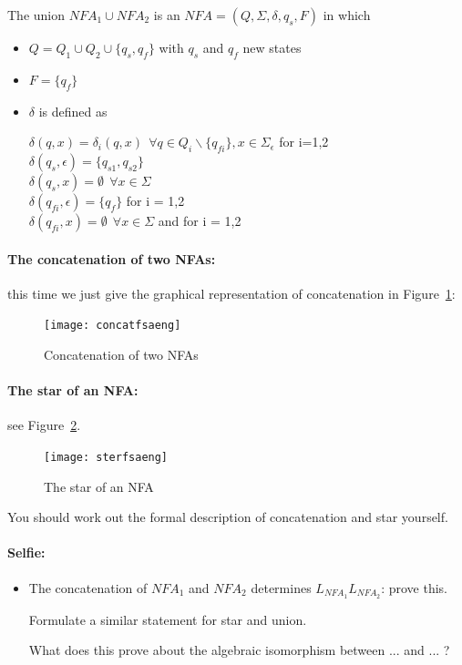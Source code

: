 The union $NFA_1 \cup NFA_2$ is an $NFA = (Q,\Sigma,\delta,q_s,F)$
in which
\begin{itemize}
\item $Q = Q_1 \cup Q_2 \cup \{q_s,q_f\}$ with $q_s$ and $q_f$ new states
\item $F = \{q_f\}$
\item $\delta$ is defined as

 $\delta(q,x) = \delta_i(q,x)~~\forall q \in Q_i \backslash \{q_{fi}\}, x \in \Sigma_\epsilon$ for i=1,2 \\
 $\delta(q_s,\epsilon) = \{q_{s1}, q_{s2}\}$ \\
 $\delta(q_s,x) = \emptyset ~~\forall x \in \Sigma$ \\
 $\delta(q_{fi},\epsilon) = \{q_f\}$ for i = 1,2 \\
 $\delta(q_{fi}, x) = \emptyset ~~\forall x \in \Sigma$ and for i = 1,2
\end{itemize}


\paragraph{The concatenation of two NFAs:} this time we just give the
graphical representation of concatenation in Figure~\ref{concatfsa}:

\begin{figure}[h]
\begin{center}\texttt{[image: concatfsaeng]}\end{center}
\caption{Concatenation of two NFAs\label{concatfsa}}
\end{figure}


\paragraph{The star of an NFA:} see Figure~\ref{starfsa}.

\begin{figure}[h]
\begin{center}\texttt{[image: sterfsaeng]}\end{center}
\caption{The star of an NFA\label{starfsa}}
\end{figure}

You should work out the formal description of concatenation and star
yourself.

\paragraph{Selfie:}
\begin{itemize}
\item[]
The concatenation of $NFA_1$ and $NFA_2$ determines
$L_{NFA_1}L_{NFA_2}$: prove this.

Formulate a similar statement for star and union.

What does this prove about the algebraic isomorphism between ... and ... ?

\end{itemize}



